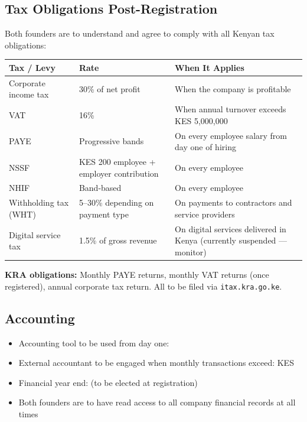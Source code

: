 \documentclass[12pt,a4paper]{article}
\newcommand{\blank}[1][5.5cm]{\underline{\hspace{#1}}}
\begin{document}
\subsection{Tax Obligations Post-Registration}

Both founders are to understand and agree to comply with all Kenyan tax obligations:

\begin{tabularx}{\linewidth}{L{4cm} L{4cm} X}
  \toprule
  \textbf{Tax / Levy} & \textbf{Rate} & \textbf{When It Applies} \\
  \midrule
  Corporate income tax  & 30\% of net profit     & When the company is profitable \\[0.3em]
  VAT                   & 16\%                   & When annual turnover exceeds KES 5{,}000{,}000 \\[0.3em]
  PAYE                  & Progressive bands      & On every employee salary from day one of hiring \\[0.3em]
  NSSF                  & KES 200 employee + employer contribution & On every employee \\[0.3em]
  NHIF                  & Band-based             & On every employee \\[0.3em]
  Withholding tax (WHT) & 5--30\% depending on payment type & On payments to contractors and service providers \\[0.3em]
  Digital service tax   & 1.5\% of gross revenue & On digital services delivered in Kenya (currently suspended --- monitor) \\
  \bottomrule
\end{tabularx}

\noindent\textbf{KRA obligations:} Monthly PAYE returns, monthly VAT returns (once registered), annual corporate tax return. All to be filed via \texttt{itax.kra.go.ke}.

\subsection{Accounting}

\begin{itemize}
  \item Accounting tool to be used from day one: \blank[5cm]
  \item External accountant to be engaged when monthly transactions exceed: KES \blank[3cm]
  \item Financial year end: \blank[3cm] (to be elected at registration)
  \item Both founders are to have read access to all company financial records at all times
\end{itemize}
\end{document}
